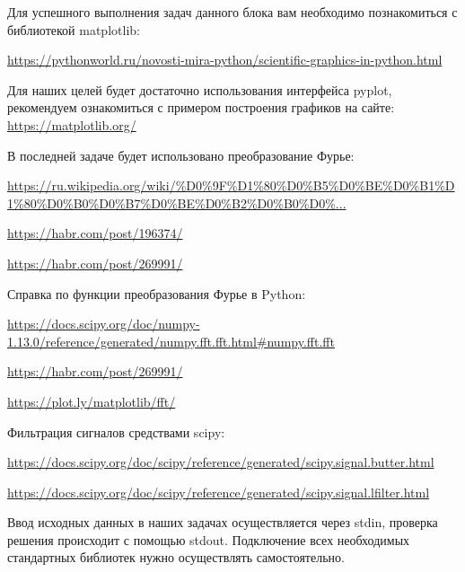 Для успешного выполнения задач данного блока вам необходимо познакомиться с библиотекой matplotlib:

\url{https://pythonworld.ru/novosti-mira-python/scientific-graphics-in-python.html}

Для наших целей будет достаточно использования интерфейса pyplot, рекомендуем ознакомиться с примером построения графиков на сайте: \url{https://matplotlib.org/}

В последней задаче будет использовано преобразование Фурье:

\url{https://ru.wikipedia.org/wiki/%D0%9F%D1%80%D0%B5%D0%BE%D0%B1%D1%80%D0%B0%D0%B7%D0%BE%D0%B2%D0%B0%D0%...}

\url{https://habr.com/post/196374/}

\url{https://habr.com/post/269991/}

Справка по функции преобразования Фурье в Python:

\url{https://docs.scipy.org/doc/numpy-1.13.0/reference/generated/numpy.fft.fft.html#numpy.fft.fft}

\url{https://habr.com/post/269991/}

\url{https://plot.ly/matplotlib/fft/}

Фильтрация сигналов средствами scipy:

\url{https://docs.scipy.org/doc/scipy/reference/generated/scipy.signal.butter.html}

\url{https://docs.scipy.org/doc/scipy/reference/generated/scipy.signal.lfilter.html}

Ввод исходных данных в наших задачах осуществляется через stdin, проверка решения происходит с помощью stdout. Подключение всех необходимых стандартных библиотек нужно осуществлять самостоятельно.
